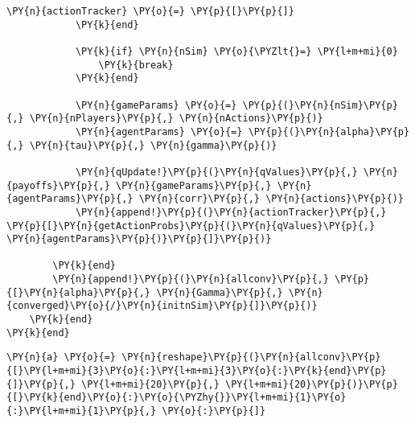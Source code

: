 \documentclass[main.tex]{subfiles}
\begin{document}
\begin{tcolorbox}[breakable, size=fbox, boxrule=1pt, pad at break*=1mm,colback=cellbackground, colframe=cellborder]
\begin{Verbatim}[commandchars=\\\{\}]
                \PY{n}{actionTracker} \PY{o}{=} \PY{p}{[}\PY{p}{]} 
            \PY{k}{end}

            \PY{k}{if} \PY{n}{nSim} \PY{o}{\PYZlt{}=} \PY{l+m+mi}{0}
                \PY{k}{break}
            \PY{k}{end}

            \PY{n}{gameParams} \PY{o}{=} \PY{p}{(}\PY{n}{nSim}\PY{p}{,} \PY{n}{nPlayers}\PY{p}{,} \PY{n}{nActions}\PY{p}{)}
            \PY{n}{agentParams} \PY{o}{=} \PY{p}{(}\PY{n}{alpha}\PY{p}{,} \PY{n}{tau}\PY{p}{,} \PY{n}{gamma}\PY{p}{)}

            \PY{n}{qUpdate!}\PY{p}{(}\PY{n}{qValues}\PY{p}{,} \PY{n}{payoffs}\PY{p}{,} \PY{n}{gameParams}\PY{p}{,} \PY{n}{agentParams}\PY{p}{,} \PY{n}{corr}\PY{p}{,} \PY{n}{actions}\PY{p}{)}
            \PY{n}{append!}\PY{p}{(}\PY{n}{actionTracker}\PY{p}{,} \PY{p}{[}\PY{n}{getActionProbs}\PY{p}{(}\PY{n}{qValues}\PY{p}{,} \PY{n}{agentParams}\PY{p}{)}\PY{p}{]}\PY{p}{)}

        \PY{k}{end}
        \PY{n}{append!}\PY{p}{(}\PY{n}{allconv}\PY{p}{,} \PY{p}{[}\PY{n}{alpha}\PY{p}{,} \PY{n}{Gamma}\PY{p}{,} \PY{n}{converged}\PY{o}{/}\PY{n}{initnSim}\PY{p}{]}\PY{p}{)}
    \PY{k}{end}
\PY{k}{end}
\end{Verbatim}
\end{tcolorbox}

    \begin{tcolorbox}[breakable, size=fbox, boxrule=1pt, pad at break*=1mm,colback=cellbackground, colframe=cellborder]
\begin{Verbatim}[commandchars=\\\{\}]
\PY{n}{a} \PY{o}{=} \PY{n}{reshape}\PY{p}{(}\PY{n}{allconv}\PY{p}{[}\PY{l+m+mi}{3}\PY{o}{:}\PY{l+m+mi}{3}\PY{o}{:}\PY{k}{end}\PY{p}{]}\PY{p}{,} \PY{l+m+mi}{20}\PY{p}{,} \PY{l+m+mi}{20}\PY{p}{)}\PY{p}{[}\PY{k}{end}\PY{o}{:}\PY{o}{\PYZhy{}}\PY{l+m+mi}{1}\PY{o}{:}\PY{l+m+mi}{1}\PY{p}{,} \PY{o}{:}\PY{p}{]}
\end{Verbatim}
\end{tcolorbox}
\end{document}
